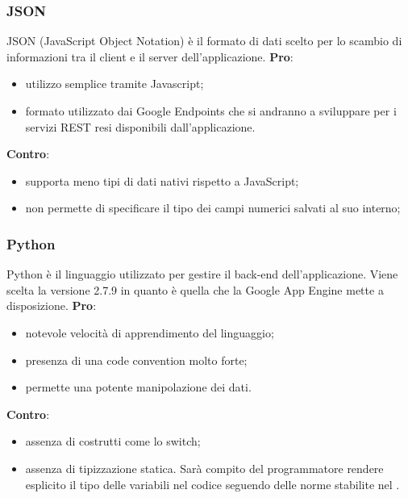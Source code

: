 		\subsubsection{JSON} %
		\label{ssub:json}
		JSON (JavaScript Object Notation) è il formato di dati scelto per lo scambio di informazioni tra il client e il server dell'applicazione. \newline
		\textbf{Pro}:
			\begin{itemize}
				\item utilizzo semplice tramite Javascript;
				\item formato utilizzato dai Google Endpoints che si andranno a sviluppare per i servizi REST resi disponibili dall'applicazione. 
			\end{itemize}
			\noindent
			\textbf{Contro}:
			\begin{itemize}
				\item supporta meno tipi di dati nativi rispetto a JavaScript;
				\item non permette di specificare il tipo dei campi numerici salvati al suo interno;
			\end{itemize}
		\noindent

		\subsubsection{Python} %
		\label{sub:python}
		Python è il linguaggio utilizzato per gestire il back-end dell'applicazione. Viene scelta la versione 2.7.9 in quanto è quella che la Google App Engine mette a disposizione. \newline
		\textbf{Pro}:
			\begin{itemize}
				\item notevole velocità di apprendimento del linguaggio;
				\item presenza di una code convention molto forte;
				\item permette una potente manipolazione dei dati.
			\end{itemize}
		\noindent
		\textbf{Contro}:
			\begin{itemize}
				\item assenza di costrutti come lo switch;
				\item assenza di tipizzazione statica. Sarà compito del programmatore rendere esplicito il tipo delle variabili nel codice seguendo delle norme stabilite nel \docNameVersionNdP.
			\end{itemize}
		\noindent

